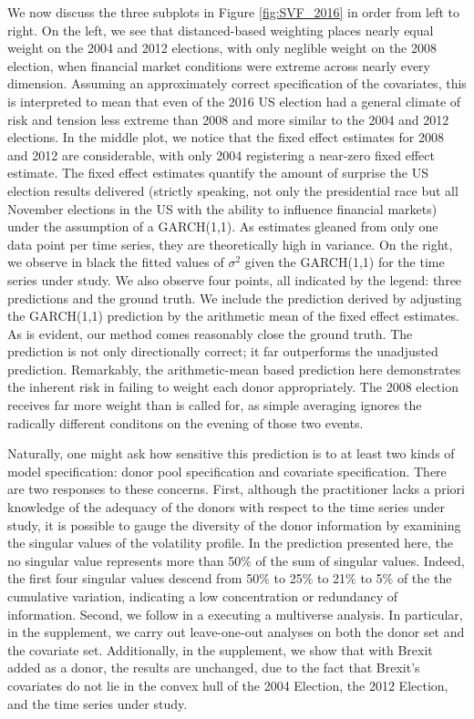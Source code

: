 \documentclass[11pt]{article}
\theoremstyle{definition}
\begin{document}
We now discuss the three subplots in Figure \ref{fig:SVF_2016} in order from left to right.  On the left, we see that distanced-based weighting places nearly equal weight on the 2004 and 2012 elections, with only neglible weight on the 2008 election, when financial market conditions were extreme across nearly every dimension.  Assuming an approximately correct specification of the covariates, this is interpreted to mean that even of the 2016 US election had a general climate of risk and tension less extreme than 2008 and more similar to the 2004 and 2012 elections.  In the middle plot, we notice that the fixed effect estimates for 2008 and 2012 are considerable, with only 2004 registering a near-zero fixed effect estimate.  The fixed effect estimates quantify the amount of surprise the US election results delivered (strictly speaking, not only the presidential race but all November elections in the US with the ability to influence financial markets) under the assumption of a GARCH(1,1).  As estimates gleaned from only one data point per time series, they are theoretically high in variance.  On the right, we observe in black the fitted values of $\sigma^{2}$ given the GARCH(1,1) for the time series under study.  We also observe four points, all indicated by the legend: three predictions and the ground truth.  We include the prediction derived by adjusting the GARCH(1,1) prediction by the arithmetic mean of the fixed effect estimates.  As is evident, our method comes reasonably close the ground truth.  The prediction is not only directionally correct; it far outperforms the unadjusted prediction.  Remarkably, the arithmetic-mean based prediction here demonstrates the inherent risk in failing to weight each donor appropriately.  The 2008 election receives far more weight than is called for, as simple averaging ignores the radically different conditons on the evening of those two events.  

Naturally, one might ask how sensitive this prediction is to at least two kinds of model specification: donor pool specification and covariate specification.  There are two responses to these concerns.  First, although the practitioner lacks a priori knowledge of the adequacy of the donors with respect to the time series under study, it is possible to gauge the diversity of the donor information by examining the singular values of the volatility profile.  In the prediction presented here, the no singular value represents more than 50$\%$ of the sum of singular values.  Indeed, the first four singular values descend from 50$\%$ to 25$\%$ to 21$\%$ to 5$\%$ of the the cumulative variation, indicating a low concentration or redundancy of information.  Second, we follow \citet{steegen2016increasing} in a executing a multiverse analysis.  In particular, in the supplement, we carry out leave-one-out analyses on both the donor set and the covariate set.  Additionally, in the supplement, we show that with Brexit added as a donor, the results are unchanged, due to the fact that Brexit's covariates do not lie in the convex hull of the 2004 Election, the 2012 Election, and the time series under study.
\end{document}
